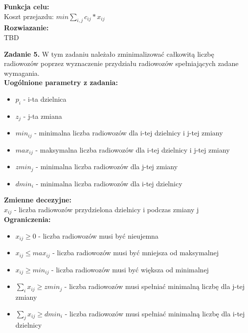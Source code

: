\documentclass[15pt, a4paper]{article}
\begin{document}
\noindent\textbf{Funkcja celu:}\\

Koszt przejazdu: \(min \sum_{i, j}c_{ij} * x_{ij} \)\\

\noindent\textbf{Rozwiazanie:}\\ 

TBD

\vspace{0.5cm}

\noindent\hrulefill

\vspace{0.5cm}


\noindent\textbf{Zadanie 5.} W tym zadaniu należało zminimalizować całkowitą liczbę radiowozów poprzez wyznaczenie przydziału radiowozów spełniających zadane wymagania.\\

\noindent\textbf{Uogólnione parametry z zadania:}

\begin{itemize}
    \item \( p_i \) - i-ta dzielnica
    \item \( z_j \) - j-ta zmiana
    \item \( min_{ij} \) - minimalna liczba radiowozów dla i-tej dzielnicy i j-tej zmiany
    \item \( max_{ij} \) - maksymalna liczba radiowozów dla i-tej dzielnicy i j-tej zmiany
    \item \( zmin_{j} \) - minimalna liczba radiowozów dla j-tej zmiany 
    \item \( dmin_{i} \) - minimalna liczba radiowozów dla i-tej dzielnicy
\end{itemize}

\noindent\textbf{Zmienne decezyjne:}\\

\(x_{ij}\) - liczba radiowozów przydzielona dzielnicy i podczas zmiany j\\

\noindent\textbf{Ograniczenia:}

\begin{itemize}
    \item \(x_{ij} \geq 0 \) - liczba radiowozów musi być nieujemna
    \item \( x_{ij} \leq max_{ij} \) - liczba radiowozów musi być mniejsza od maksymalnej
    \item \( x_{ij} \geq min_{ij} \) - liczba radiowozów musi być większa od minimalnej
    \item \(\sum_{i}x_{ij} \geq zmin_j \) - liczba radiowozów musi spełniać minimalną liczbę dla j-tej zmiany
    \item \(\sum_{j}x_{ij} \geq dmin_i \) - liczba radiowozów musi spełniać minimalną liczbę dla i-tej dzielnicy
\end{itemize}
\end{document}
